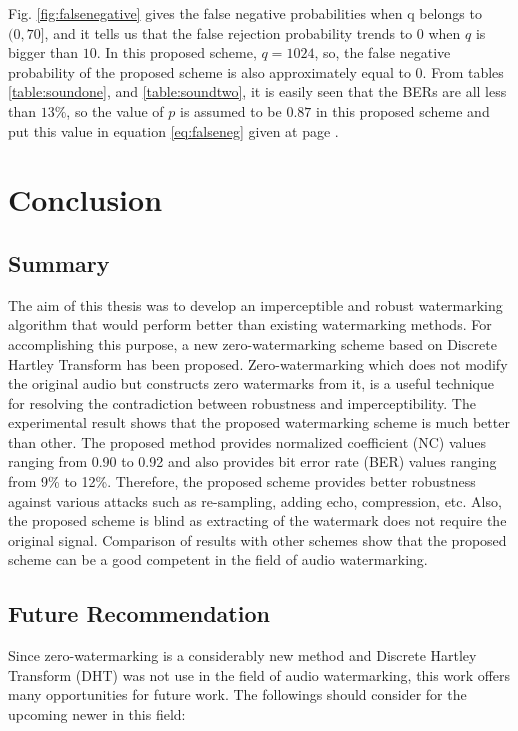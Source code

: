 \documentclass[12pt,a4paper]{report}
\begin{document}
\bigskip

Fig. \ref{fig:falsenegative} gives the false negative probabilities when q belongs to $(0, 70]$, and it tells us that the false rejection probability trends to $0$ when $q$ is bigger than $10$. In this proposed scheme, $q = 1024$, so, the false negative probability of the proposed scheme is also approximately equal to $0$. From tables \ref{table:soundone}, and \ref{table:soundtwo}, it is easily seen that the BERs are all less than $13\%$, so the value of $p$ is assumed to be $0.87$ in this proposed scheme and put this value in equation \ref{eq:falseneg} given at page \pageref{eq:falseneg}.

\chapter{Conclusion}

\section{Summary}

The aim of this thesis was to develop an imperceptible and robust watermarking algorithm that would perform better than existing watermarking methods. For accomplishing this purpose, a new zero-watermarking scheme based on Discrete Hartley Transform has been proposed. Zero-watermarking which does not modify the original audio but constructs zero watermarks from it, is a useful technique for resolving the contradiction between robustness and imperceptibility. The experimental result shows that the proposed watermarking scheme is much better than other. The proposed method provides normalized coefficient (NC) values ranging from 0.90 to 0.92 and also provides bit error rate (BER) values ranging from 9\% to 12\%. Therefore, the proposed scheme provides better robustness against various attacks such as re-sampling, adding echo, compression, etc. Also, the proposed scheme is blind as extracting of the watermark does not require the original signal. Comparison of results with other schemes show that the proposed scheme can be a good competent in the field of audio watermarking.


\section{Future Recommendation}

Since zero-watermarking is a considerably new method and Discrete Hartley Transform (DHT) was not use in the field of audio watermarking, this work offers many opportunities for future work. The followings should consider for the upcoming newer in this field:
\end{document}
